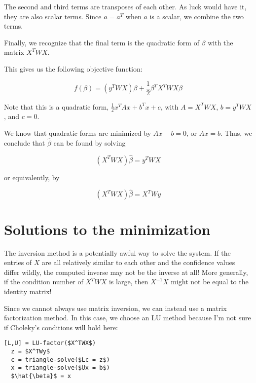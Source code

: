 \documentclass{article}
\begin{document}
The second and third terms are transposes of each other. As luck would have it,
they are also scalar terms. Since $a = a^T$ when $a$ is a scalar, we combine the
two terms.

Finally, we recognize that the final term is the quadratic form of $\beta$ with
the matrix $X^TWX$.

This gives us the following objective function:

\[
 f(\beta) = (y^T W X) \beta + \frac{1}{2} \beta^T X^T W X \beta
\]

Note that this is a quadratic form, $\frac{1}{2}x^TAx + b^Tx + c$, with $A =
X^TWX$, $b=y^TWX$, and $c=0$.

We know that quadratic forms are minimized by $Ax - b = 0$, or $Ax = b$. Thus,
we conclude that $\hat{\beta}$ can be found by solving

\[
  (X^TWX)\hat{\beta} = y^TWX
\]

or equivalently, by

\[
  (X^TWX)\hat{\beta} = X^TWy
\]

\section{Solutions to the minimization}

The inversion method is a potentially awful way to solve the system. If the
entries of $X$ are all relatively similar to each other and the confidence
values differ wildly, the computed inverse may not be the inverse at all! More
generally, if the condition number of $X^TWX$ is large, then $X^{-1}X$ might not
be equal to the identity matrix!


Since we cannot always use matrix inversion, we can instead use a matrix
factorization method. In this case, we choose an LU method because I'm not sure
if Choleky's conditions will hold here:

\begin{lstlisting}[mathescape = true]
  [L,U] = LU-factor($X^TWX$)
  z = $X^TWy$
  c = triangle-solve($Lc = z$)
  x = triangle-solve($Ux = b$)
  $\hat{\beta}$ = x
\end{lstlisting}
\end{document}
